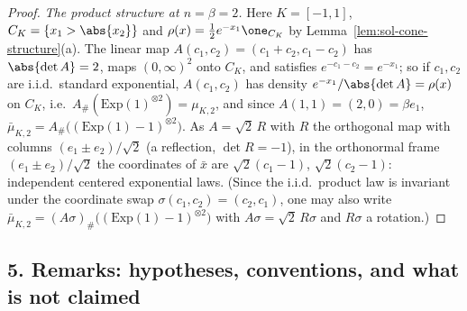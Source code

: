 \documentclass[../main.tex]{subfiles}
\begin{document}
\begin{proof}
\emph{The product structure at $n=\beta=2$.}
Here $K=[-1,1]$, $C_K=\{x_1>\abs{x_2}\}$ and $\rho(x)=\tfrac12e^{-x_1}\one_{C_K}$ by
Lemma~\ref{lem:sol-cone-structure}(a).  The linear map $A(c_1,c_2)=(c_1+c_2,c_1-c_2)$ has
$\abs{\det A}=2$, maps $(0,\infty)^2$ onto $C_K$, and satisfies $e^{-c_1-c_2}=e^{-x_1}$; so
if $c_1,c_2$ are i.i.d.\ standard exponential, $A(c_1,c_2)$ has density
$e^{-x_1}/\abs{\det A}=\rho(x)$ on $C_K$, i.e.\ $A_\#(\mathrm{Exp}(1)^{\otimes2})=\mu_{K,2}$,
and since $A(1,1)=(2,0)=\beta e_1$, $\bar\mu_{K,2}=A_\#\bigl((\mathrm{Exp}(1)-1)^{\otimes2}\bigr)$.
As $A=\sqrt2\,R$ with $R$ the orthogonal map with columns $(e_1\pm e_2)/\sqrt2$ (a
reflection, $\det R=-1$), in the orthonormal frame $(e_1\pm e_2)/\sqrt2$ the coordinates of
$\bar x$ are $\sqrt2(c_1-1)$, $\sqrt2(c_2-1)$: independent centered exponential laws.  (Since
the i.i.d.\ product law is invariant under the coordinate swap $\sigma(c_1,c_2)=(c_2,c_1)$,
one may also write $\bar\mu_{K,2}=(A\sigma)_\#\bigl((\mathrm{Exp}(1)-1)^{\otimes2}\bigr)$ with
$A\sigma=\sqrt2\,R\sigma$ and $R\sigma$ a rotation.)
\end{proof}

\subsection*{5. Remarks: hypotheses, conventions, and what is not claimed}
\label{subsec:sol-cone-remarks}
\end{document}
